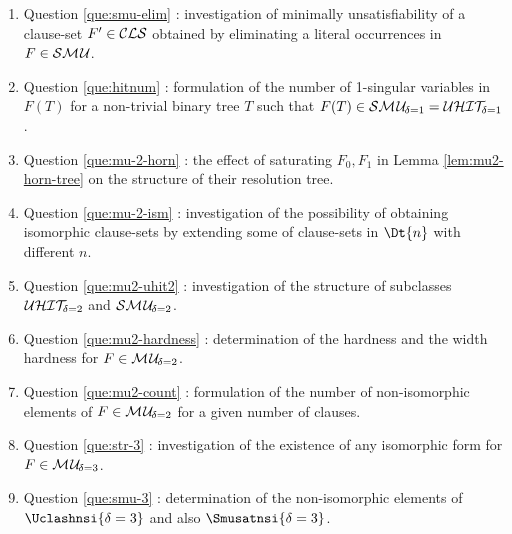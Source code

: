 \documentclass{report}
\begin{document}
\begin{enumerate}
  \item Question \ref{que:smu-elim} : investigation of minimally unsatisfiability of a clause-set $F' \in \mathcal{CLS} $ obtained by eliminating a literal occurrences in $F \in \mathcal{S}\mathcal{M\hspace{0.8pt}U}$.
  \item Question \ref{que:hitnum} : formulation of the number of 1-singular variables in $F(T)$ for a non-trivial binary tree $T$ such that $F(T) \in \mathcal{S}\mathcal{M\hspace{0.8pt}U}_{\!\delta=1}=\mathcal{U}\mathcal{HIT}_{\!\!\delta=1}$.
  \item Question \ref{que:mu-2-horn} : the effect of saturating $F_0, F_1$ in Lemma \ref{lem:mu2-horn-tree} on the structure of their resolution tree.
  \item Question \ref{que:mu-2-ism} : investigation of the possibility of obtaining isomorphic clause-sets by extending some of clause-sets in $\Dt{n}$ with different $n$.
  \item Question \ref{que:mu2-uhit2} : investigation of the structure of subclasses $\mathcal{U}\mathcal{HIT}_{\!\!\delta=2}$ and $\mathcal{S}\mathcal{M\hspace{0.8pt}U}_{\!\delta=2}$.
  \item Question \ref{que:mu2-hardness} : determination of the hardness and the width hardness for $F \in \mathcal{M\hspace{0.8pt}U}_{\!\delta=2}$.
  \item Question \ref{que:mu2-count} : formulation of the number of non-isomorphic elements of $F \in \mathcal{M\hspace{0.8pt}U}_{\!\delta=2}$ for a given number of clauses.
  \item Question \ref{que:str-3} : investigation of the existence of any isomorphic form for $F \in \mathcal{M\hspace{0.8pt}U}_{\!\delta=3}$.
  \item Question \ref{que:smu-3} : determination of the non-isomorphic elements of $\Uclashnsi{\delta=3}$ and also $\Smusatnsi{\delta=3}$.
  \end{enumerate}


\end{document}
